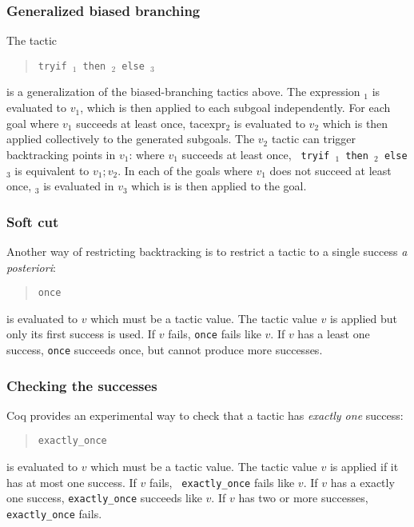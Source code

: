 \subsubsection[Generalized biased branching]{Generalized biased branching
}

The tactic
\begin{quote}
{\tt tryif {\tacexpr}$_1$ then {\tacexpr}$_2$ else {\tacexpr}$_3$}
\end{quote}
is a generalization of the biased-branching tactics above. The
expression {\tacexpr}$_1$ is evaluated to $v_1$, which is then applied
to each subgoal independently. For each goal where $v_1$ succeeds at
least once, {tacexpr}$_2$ is evaluated to $v_2$ which is then applied
collectively to the generated subgoals. The $v_2$ tactic can trigger
backtracking points in $v_1$: where $v_1$ succeeds at least once, {\tt
  tryif {\tacexpr}$_1$ then {\tacexpr}$_2$ else {\tacexpr}$_3$} is
equivalent to $v_1;v_2$. In each of the goals where $v_1$ does not
succeed at least once, {\tacexpr}$_3$ is evaluated in $v_3$ which is
is then applied to the goal.

\subsubsection[Soft cut]{Soft cut}

Another way of restricting backtracking is to restrict a tactic to a
single success \emph{a posteriori}:
\begin{quote}
{\tt once} {\tacexpr}
\end{quote}
{\tacexpr} is evaluated to $v$ which must be a tactic value.
The tactic value $v$ is
applied but only its first success is used. If $v$ fails, {\tt once}
{\tacexpr} fails like $v$. If $v$ has a least one success, {\tt once}
{\tacexpr} succeeds once, but cannot produce more successes.

\subsubsection[Checking the successes]{Checking the successes}

Coq provides an experimental way to check that a tactic has \emph{exactly one} success:
\begin{quote}
{\tt exactly\_once} {\tacexpr}
\end{quote}
{\tacexpr} is evaluated to $v$ which must be a tactic value.
The tactic value $v$ is
applied if it has at most one success. If $v$ fails, {\tt
  exactly\_once} {\tacexpr} fails like $v$. If $v$ has a exactly one
success, {\tt exactly\_once} {\tacexpr} succeeds like $v$. If $v$ has
two or more successes, {\tt exactly\_once} {\tacexpr} fails.

